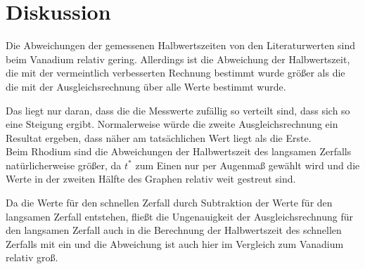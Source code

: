 \newpage
\section{Diskussion}
    Die Abweichungen der gemessenen Halbwertszeiten von den Literaturwerten sind beim Vanadium relativ gering.
    Allerdings ist die Abweichung der Halbwertszeit, die mit der vermeintlich verbesserten Rechnung bestimmt wurde größer als die die mit der Ausgleichsrechnung über alle Werte bestimmt wurde.

    Das liegt nur daran, dass die die Messwerte zufällig so verteilt sind, dass sich so eine Steigung ergibt. Normalerweise würde die zweite Ausgleichsrechnung ein Resultat ergeben, dass näher am tatsächlichen Wert liegt als die Erste. \\

    Beim Rhodium sind die Abweichungen der Halbwertszeit des langsamen Zerfalls natürlicherweise größer, da $t^*$ zum Einen nur per Augenmaß gewählt wird und die Werte in der zweiten Hälfte des Graphen relativ weit gestreut sind.

    Da die Werte für den schnellen Zerfall durch Subtraktion der Werte für den langsamen Zerfall entstehen, fließt die Ungenauigkeit der Ausgleichsrechnung für den langsamen Zerfall auch in die Berechnung der Halbwertszeit des schnellen Zerfalls mit ein und die Abweichung ist auch hier im Vergleich zum Vanadium relativ groß.
